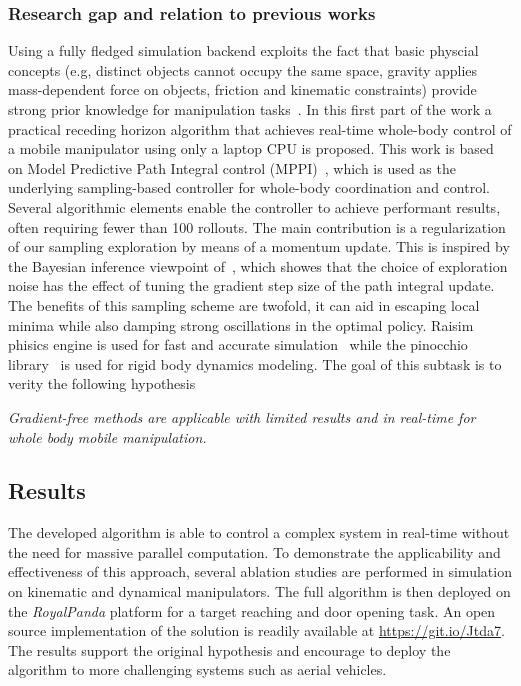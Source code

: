 \subsubsection{Research gap and relation to previous works}
Using a fully fledged simulation backend exploits the fact that basic physcial concepts (e.g, distinct objects cannot occupy the same space, gravity applies mass-dependent force on objects, friction and kinematic constraints) provide strong prior knowledge for manipulation tasks~\cite{kroemer2019review}. In this first part of the work a practical receding horizon algorithm that achieves real-time whole-body control of a mobile manipulator using only a laptop CPU is proposed. This work is based on Model Predictive Path Integral control (MPPI)~\cite{williams_information_2017}, which is used as the underlying sampling-based controller for whole-body coordination and control. Several algorithmic elements enable the controller to achieve performant results, often requiring fewer than 100 rollouts. The main contribution is a regularization of our sampling exploration by means of a momentum update. This is inspired by the Bayesian inference viewpoint of~\cite{lambert_stein_2020}, which showes that the choice of exploration noise has the effect of tuning the gradient step size of the path integral update. The benefits of this sampling scheme are twofold, it can aid in escaping local minima while also damping strong oscillations in the optimal policy. Raisim phisics engine is used for fast and accurate simulation~\cite{raisim} while the pinocchio library~\cite{pinocchioweb} is used for rigid body dynamics modeling. The goal of this subtask is to verity the following hypothesis
\begin{displayquote}
\textit{Gradient-free methods are applicable with limited results and in real-time for whole body mobile manipulation.}
\end{displayquote}

\subsection{Results}
The developed algorithm is able to control a complex system in real-time without the need for massive parallel computation. To demonstrate the applicability and effectiveness of this approach, several ablation studies are performed in simulation on kinematic and dynamical manipulators. The full algorithm is then deployed on the \textit{RoyalPanda} platform for a target reaching and door opening task. An open source implementation of the solution is readily available at \url{https://git.io/Jtda7}. The results support the original hypothesis and encourage to deploy the algorithm to more challenging systems such as aerial vehicles.


